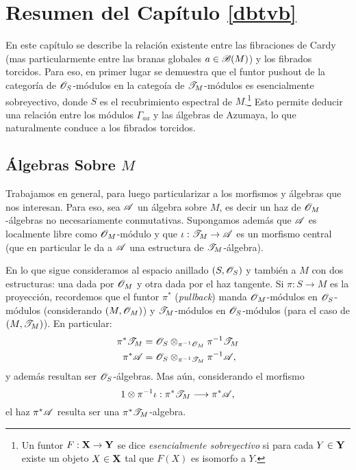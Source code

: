 {\small
\section{Resumen del Cap\'itulo \ref{dbtvb}}

En este cap\'itulo se describe la relaci\'on existente entre las fibraciones de Cardy (mas particularmente entre las branas globales $a\in \mathscr{B}(M)$) y los fibrados torcidos. Para eso, en primer lugar se demuestra que el funtor pushout de la categor\'ia de $\mathscr{O}_S$-m\'odulos en la catego\'ia de $\mathscr{T}_M$-m\'odulos es esencialmente sobreyectivo, donde $S$ es el recubrimiento espectral de $M$.\footnote{Un funtor $F:{\bf X}\to {\bf Y}$ se dice \emph{esencialmente sobreyectivo} si para cada $Y\in {\bf Y}$ existe un objeto $X\in {\bf X}$  tal que $F(X)$ es isomorfo a $Y$.} Esto permite deducir una relaci\'on entre los m\'odulos $\Gamma_{aa}$ y las \'algebras de Azumaya, lo que naturalmente conduce a los fibrados torcidos.


\subsection{\'Algebras Sobre $M$}

Trabajamos en general, para luego particularizar a los morfismos y \'algebras que nos interesan. Para eso, sea $\mathscr{A}$ un \'algebra sobre $M$, es decir un haz de $\mathscr{O}_M$-\'algebras no necesariamente conmutativas. Supongamos adem\'as que $\mathscr{A}$ es localmente libre como $\mathscr{O}_M$-m\'odulo y que $\iota :\mathscr{T}_M\to \mathscr{A}$ es un morfismo central (que en particular le da a $\mathscr{A}$ una estructura de $\mathscr{T}_M$-\'algebra).

En lo que sigue consideramos al espacio anillado $(S,\mathscr{O}_S)$ y tambi\'en a $M$ con dos estructuras: una dada por $\mathscr{O}_M$ y otra dada por el haz tangente. Si $\pi :S\to M$ es la proyecci\'on, recordemos que el funtor $\pi^*$ (\emph{pullback}) manda $\mathscr{O}_M$-m\'odulos en $\mathscr{O}_S$-m\'odulos (considerando $(M,\mathscr{O}_M)$) y $\mathscr{T}_M$-m\'odulos en $\mathscr{O}_S$-m\'odulos (para el caso de $(M,\mathscr{T}_M)$). En particular:
$$
\begin{aligned}
\pi^*\mathscr{T}_M &= \mathscr{O}_S\otimes_{\pi^{-1}\mathscr{O}_M}\pi^{-1}\mathscr{T}_M \\
\pi^*\mathscr{A}   &= \mathscr{O}_S\otimes_{\pi^{-1}\mathscr{T}_M}\pi^{-1}\mathscr{A}, \\
\end{aligned}
$$
y adem\'as resultan ser $\mathscr{O}_S$-\'algebras. Mas a\'un, considerando el morfismo
$$1\otimes \pi^{-1}\iota :\pi^*\mathscr{T}_M\longrightarrow \pi^*\mathscr{A},$$
el haz $\pi^*\mathscr{A}$ resulta ser una $\pi^*\mathscr{T}_M$-algebra.

}
